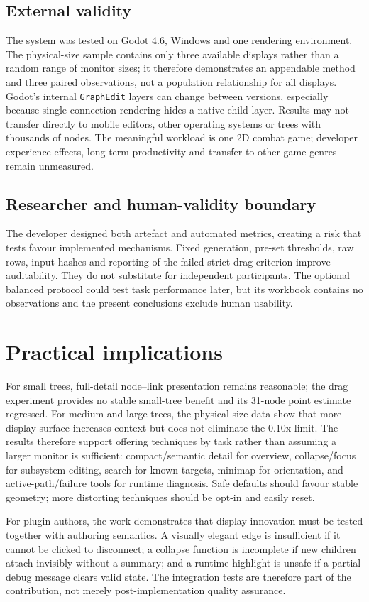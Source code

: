 \subsection{External validity}

The system was tested on Godot 4.6, Windows and one rendering environment. The physical-size sample contains only three available displays rather than a random range of monitor sizes; it therefore demonstrates an appendable method and three paired observations, not a population relationship for all displays. Godot's internal \texttt{GraphEdit} layers can change between versions, especially because single-connection rendering hides a native child layer. Results may not transfer directly to mobile editors, other operating systems or trees with thousands of nodes. The meaningful workload is one 2D combat game; developer experience effects, long-term productivity and transfer to other game genres remain unmeasured.

\subsection{Researcher and human-validity boundary}

The developer designed both artefact and automated metrics, creating a risk that tests favour implemented mechanisms. Fixed generation, pre-set thresholds, raw rows, input hashes and reporting of the failed strict drag criterion improve auditability. They do not substitute for independent participants. The optional balanced protocol could test task performance later, but its workbook contains no observations and the present conclusions exclude human usability.

\section{Practical implications}

For small trees, full-detail node--link presentation remains reasonable; the drag experiment provides no stable small-tree benefit and its 31-node point estimate regressed. For medium and large trees, the physical-size data show that more display surface increases context but does not eliminate the 0.10x limit. The results therefore support offering techniques by task rather than assuming a larger monitor is sufficient: compact/semantic detail for overview, collapse/focus for subsystem editing, search for known targets, minimap for orientation, and active-path/failure tools for runtime diagnosis. Safe defaults should favour stable geometry; more distorting techniques should be opt-in and easily reset.

For plugin authors, the work demonstrates that display innovation must be tested together with authoring semantics. A visually elegant edge is insufficient if it cannot be clicked to disconnect; a collapse function is incomplete if new children attach invisibly without a summary; and a runtime highlight is unsafe if a partial debug message clears valid state. The integration tests are therefore part of the contribution, not merely post-implementation quality assurance.

